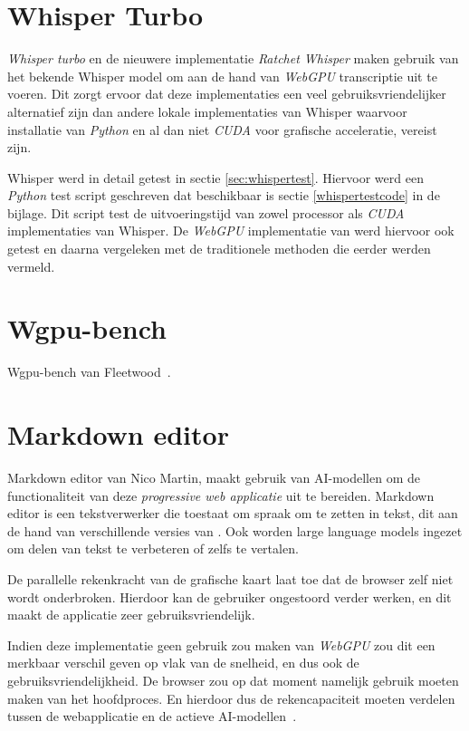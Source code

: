 \section{Whisper Turbo}

\textit{Whisper turbo} en de nieuwere implementatie \textit{Ratchet Whisper} maken gebruik van het bekende Whisper model om aan de hand van \textit{WebGPU} transcriptie uit te voeren. Dit zorgt ervoor dat deze implementaties een veel gebruiksvriendelijker alternatief zijn dan andere lokale implementaties van Whisper waarvoor installatie van \textit{Python} en al dan niet \textit{CUDA} voor grafische acceleratie, vereist zijn. 

\bigbreak{}

Whisper werd in detail getest in sectie \ref{sec:whispertest}. Hiervoor werd een \textit{Python} test script geschreven dat beschikbaar is sectie \ref{whispertestcode} in de bijlage. Dit script test de uitvoeringstijd van zowel processor als \textit{CUDA} implementaties van Whisper. De \textit{WebGPU} implementatie van \textcite{Fleetwood2024} werd hiervoor ook getest en daarna vergeleken met de traditionele methoden die eerder werden vermeld.

\section{Wgpu-bench}

Wgpu-bench van Fleetwood~\autocite{Fleetwood2023d}.

\section{Markdown editor}

Markdown editor van Nico Martin, maakt gebruik van AI-modellen om de functionaliteit van deze \textit{progressive web applicatie} uit te bereiden. Markdown editor is een tekstverwerker die toestaat om spraak om te zetten in tekst, dit aan de hand van verschillende versies van \textcite{radford2022whisper}. Ook worden {large language models} ingezet om delen van tekst te verbeteren of zelfs te vertalen. 

\bigbreak{}

De parallelle rekenkracht van de grafische kaart laat toe dat de browser zelf niet wordt onderbroken. Hierdoor kan de gebruiker ongestoord verder werken, en dit maakt de applicatie zeer gebruiksvriendelijk.

\bigbreak{}

Indien deze implementatie geen gebruik zou maken van \textit{WebGPU} zou dit een merkbaar verschil geven op vlak van de snelheid, en dus ook de gebruiksvriendelijkheid. De browser zou op dat moment namelijk gebruik moeten maken van het hoofdproces. En hierdoor dus de  rekencapaciteit moeten verdelen tussen de webapplicatie en de actieve AI-modellen~\autocite{Martin2020}.

